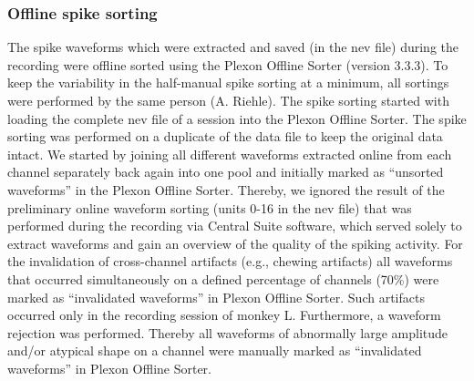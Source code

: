 {\subsubsection{Offline spike sorting}
\label{sec:offline_spike_sorting}
The spike waveforms which were extracted and saved (in the nev file) during the recording were offline sorted using the Plexon Offline Sorter (version 3.3.3). To keep the variability in the half-manual spike sorting at a minimum, all sortings were performed by the same person (A. Riehle). The spike sorting started with loading the complete nev file of a session into the Plexon Offline Sorter. The spike sorting was performed on a duplicate of the data file to keep the original data intact. We started by joining all different waveforms extracted online from each channel separately back again into one pool and initially marked as “unsorted waveforms” in the Plexon Offline Sorter. Thereby, we ignored the result of the preliminary online waveform sorting (units 0-16 in the nev file) that was performed during the recording via Central Suite software, which served solely to extract waveforms and gain an overview of the quality of the spiking activity. For the invalidation of cross-channel artifacts (e.g., chewing artifacts) all waveforms that occurred simultaneously on a defined percentage of channels (70\%) were marked as “invalidated waveforms” in Plexon Offline Sorter. Such artifacts occurred only in the recording session of monkey L. Furthermore, a waveform rejection was performed. Thereby all waveforms of abnormally large amplitude and/or atypical shape on a channel were manually marked as “invalidated waveforms” in Plexon Offline Sorter.

}
